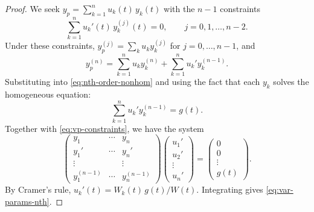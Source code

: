 \documentclass[12pt,a4paper,openany]{book}
\theoremstyle{definition}
\theoremstyle{plain}
\theoremstyle{remark}
\begin{document}
\begin{proof}
We seek $y_p = \sum_{k=1}^n u_k(t)\,y_k(t)$ with the $n-1$ constraints
\begin{equation}\label{eq:vp-constraints}
  \sum_{k=1}^n u_k'(t)\,y_k^{(j)}(t) = 0, \qquad j=0,1,\dots,n-2.
\end{equation}
Under these constraints, $y_p^{(j)} = \sum_k u_k y_k^{(j)}$ for
$j=0,\dots,n-1$, and
\[
  y_p^{(n)} = \sum_{k=1}^n u_k y_k^{(n)} + \sum_{k=1}^n u_k' y_k^{(n-1)}.
\]
Substituting into \eqref{eq:nth-order-nonhom} and using the fact that each
$y_k$ solves the homogeneous equation:
\[
  \sum_{k=1}^n u_k' y_k^{(n-1)} = g(t).
\]
Together with \eqref{eq:vp-constraints}, we have the system
\begin{equation}\label{eq:vp-system}
  \begin{pmatrix}
    y_1 & \cdots & y_n \\
    y_1' & \cdots & y_n' \\
    \vdots & & \vdots \\
    y_1^{(n-1)} & \cdots & y_n^{(n-1)}
  \end{pmatrix}
  \begin{pmatrix} u_1' \\ u_2' \\ \vdots \\ u_n' \end{pmatrix}
  = \begin{pmatrix} 0 \\ 0 \\ \vdots \\ g(t) \end{pmatrix}.
\end{equation}
By Cramer's rule, $u_k'(t) = W_k(t)\,g(t)/W(t)$.
Integrating gives \eqref{eq:var-params-nth}.
\end{proof}
\end{document}
